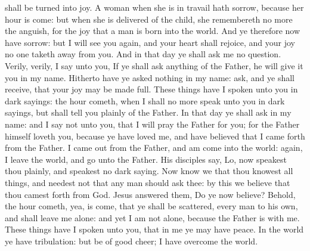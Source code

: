 shall be turned into joy. A woman when she is in travail hath sorrow, because her hour is come: but when she is delivered of the child, she remembereth no more the anguish, for the joy that a man is born into the world. And ye therefore now have sorrow: but I will see you again, and your heart shall rejoice, and your joy no one taketh away from you. And in that day ye shall ask me no question. Verily, verily, I say unto you, If ye shall ask anything of the Father, he will give it you in my name. Hitherto have ye asked nothing in my name: ask, and ye shall receive, that your joy may be made full.  These things have I spoken unto you in dark sayings: the hour cometh, when I shall no more speak unto you in dark sayings, but shall tell you plainly of the Father. In that day ye shall ask in my name: and I say not unto you, that I will pray the Father for you; for the Father himself loveth you, because ye have loved me, and have believed that I came forth from the Father. I came out from the Father, and am come into the world: again, I leave the world, and go unto the Father. His disciples say, Lo, now speakest thou plainly, and speakest no dark saying. Now know we that thou knowest all things, and needest not that any man should ask thee: by this we believe that thou camest forth from God. Jesus answered them, Do ye now believe? Behold, the hour cometh, yea, is come, that ye shall be scattered, every man to his own, and shall leave me alone: and yet I am not alone, because the Father is with me. These things have I spoken unto you, that in me ye may have peace. In the world ye have tribulation: but be of good cheer; I have overcome the world. 

